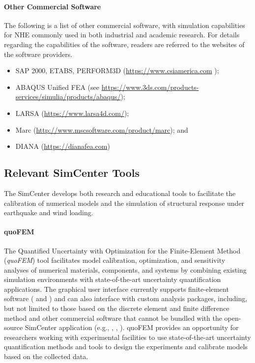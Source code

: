 \paragraph{Other Commercial Software} The following is a list of other commercial software, with simulation capabilities for NHE commonly used in both industrial and academic research.  For details regarding the capabilities of the software, readers are referred to the websites of the software providers.

\begin{itemize}
    \item SAP 2000, ETABS, PERFORM3D (\url{https://www.csiamerica.com} );

    \item ABAQUS Unified FEA (see \url{https://www.3ds.com/products-services/simulia/products/abaqus/});

    \item LARSA (\url{https://www.larsa4d.com/});

    \item Marc (\url{http://www.mscsoftware.com/product/marc}); and

    \item DIANA (\url{https://dianafea.com})
\end{itemize}

\subsection{Relevant SimCenter Tools}

The SimCenter develops both research and educational tools to facilitate the calibration of numerical models and the simulation of structural response under earthquake and wind loading.

\paragraph{quoFEM} The Quantified Uncertainty with Optimization for the Finite-Element Method (\emph{quoFEM}) tool facilitates model calibration, optimization, and sensitivity analyses of numerical materials, components, and systems by combining existing simulation environments with state-of-the-art uncertainty quantification applications. The graphical user interface currently supports finite-element software ( and ) and can also interface with custom analysis packages, including, but not limited to those based on the discrete element and finite difference method and other commercial software that cannot be bundled with the open-source SimCenter application (e.g., , , ). quoFEM provides an opportunity for researchers working with experimental facilities to use state-of-the-art uncertainty quantification methods and tools to design the experiments and calibrate models based on the collected data.

